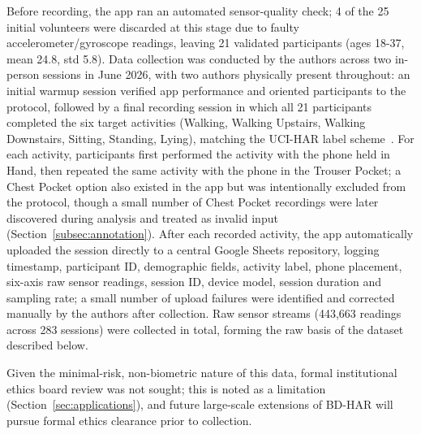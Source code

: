 \documentclass[conference]{IEEEtran}
\begin{document}
Before recording, the app ran an automated sensor-quality check;
4 of the 25 initial volunteers were discarded at this stage due to
faulty accelerometer/gyroscope readings, leaving 21 validated
participants (ages 18-37, mean 24.8, std 5.8). Data collection was
conducted by the authors across two in-person sessions in June 2026,
with two authors physically present throughout: an initial warmup
session verified app performance and oriented participants to the
protocol, followed by a final recording session in which all 21
participants completed the six target activities (Walking, Walking
Upstairs, Walking Downstairs, Sitting, Standing, Lying), matching the
UCI-HAR label scheme~\cite{anguita_public_2013}. For each activity,
participants first performed the activity with the phone held in
Hand, then repeated the same activity with the phone in the Trouser
Pocket; a Chest Pocket option also existed in the app but was
intentionally excluded from the protocol, though a small number of
Chest Pocket recordings were later discovered during analysis and
treated as invalid input (Section~\ref{subsec:annotation}). After each
recorded activity, the app automatically uploaded the session directly
to a central Google Sheets repository, logging timestamp,
participant ID, demographic fields, activity label, phone placement,
six-axis raw sensor readings, session ID, device model, session
duration and sampling rate; a small number of upload failures were
identified and corrected manually by the authors after collection.
Raw sensor streams (443{,}663 readings across 283 sessions) were
collected in total, forming the raw basis of the dataset described
below.

Given the minimal-risk, non-biometric nature of this data, formal
institutional ethics board review was not sought; this is noted as a
limitation (Section~\ref{sec:applications}), and future large-scale
extensions of BD-HAR will pursue formal ethics clearance prior to
collection.
\end{document}
